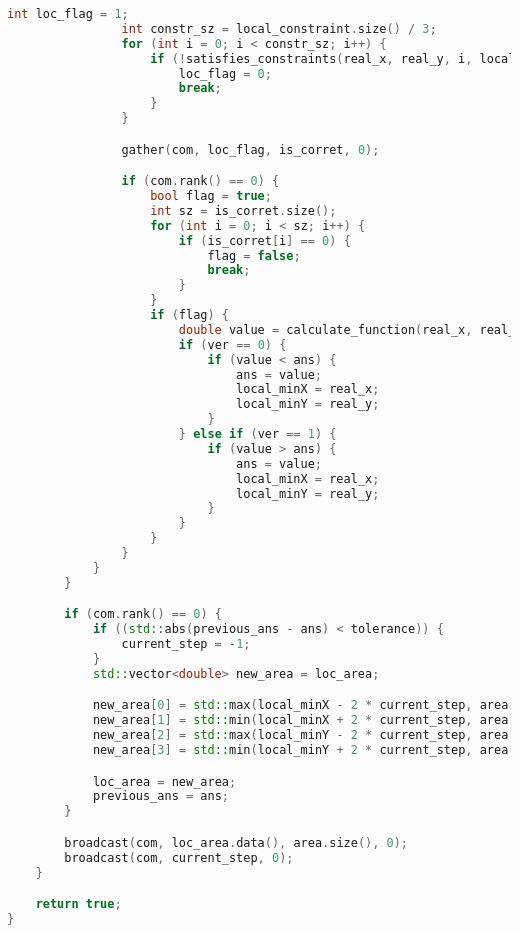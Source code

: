 \documentclass[a4paper,12pt]{article}
\begin{document}
\begin{lstlisting}[language=C++, caption=Код параллельной версии]
                int loc_flag = 1;
                int constr_sz = local_constraint.size() / 3;
                for (int i = 0; i < constr_sz; i++) {
                    if (!satisfies_constraints(real_x, real_y, i, local_constraint)) {
                        loc_flag = 0;
                        break;
                    }
                }

                gather(com, loc_flag, is_corret, 0);

                if (com.rank() == 0) {
                    bool flag = true;
                    int sz = is_corret.size();
                    for (int i = 0; i < sz; i++) {
                        if (is_corret[i] == 0) {
                            flag = false;
                            break;
                        }
                    }
                    if (flag) {
                        double value = calculate_function(real_x, real_y, funct);
                        if (ver == 0) {
                            if (value < ans) {
                                ans = value;
                                local_minX = real_x;
                                local_minY = real_y;
                            }
                        } else if (ver == 1) {
                            if (value > ans) {
                                ans = value;
                                local_minX = real_x;
                                local_minY = real_y;
                            }
                        }
                    }
                }
            }
        }

        if (com.rank() == 0) {
            if ((std::abs(previous_ans - ans) < tolerance)) {
                current_step = -1;
            }
            std::vector<double> new_area = loc_area;

            new_area[0] = std::max(local_minX - 2 * current_step, area[0]);
            new_area[1] = std::min(local_minX + 2 * current_step, area[1]);
            new_area[2] = std::max(local_minY - 2 * current_step, area[2]);
            new_area[3] = std::min(local_minY + 2 * current_step, area[3]);

            loc_area = new_area;
            previous_ans = ans;
        }

        broadcast(com, loc_area.data(), area.size(), 0);
        broadcast(com, current_step, 0);
    }

    return true;
}
\end{lstlisting}
\end{document}
